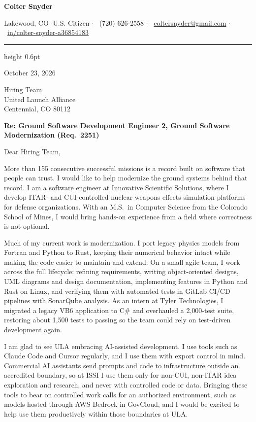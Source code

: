 \documentclass[letterpaper,11pt]{article}
\begin{document}
\begin{center}
  {\Huge\bfseries Colter Snyder}\par\vspace{4pt}
  \footnotesize
  Lakewood, CO \enspace$\cdot$\enspace U.S. Citizen \enspace$\cdot$\enspace
  \faPhone*\ (720) 626-2558 \enspace$\cdot$\enspace
  \faEnvelope\ \href{mailto:coltersnyder@gmail.com}{coltersnyder@gmail.com} \enspace$\cdot$\enspace
  \mbox{\faLinkedin\ \href{https://www.linkedin.com/in/colter-snyder-a36854183/}{in/colter-snyder-a36854183}}
\end{center}
{\color{accent}\hrule height 0.6pt}
\vspace{6pt}

October 23, 2026

Hiring Team\\
United Launch Alliance\\
Centennial, CO 80112

\textbf{Re: Ground Software Development Engineer 2, Ground Software Modernization (Req.\ 2251)}

Dear Hiring Team,

More than 155 consecutive successful missions is a record built on software that people can trust. I
would like to help modernize the ground systems behind that record. I am a software engineer at
Innovative Scientific Solutions, where I develop ITAR- and CUI-controlled nuclear weapons effects
simulation platforms for defense organizations. With an M.S.\ in Computer Science from the Colorado School of
Mines, I would bring hands-on experience from a field where correctness is not optional.

Much of my current work is modernization. I port legacy physics models from Fortran and Python to
Rust, keeping their numerical behavior intact while making the code easier to maintain and extend.
On a small agile team, I work across the full lifecycle: refining requirements, writing
object-oriented designs, UML diagrams and design documentation, implementing features in Python and Rust on Linux,
and verifying them with automated tests in GitLab CI/CD pipelines with SonarQube analysis. As an
intern at Tyler Technologies, I migrated a legacy VB6 application to C\# and overhauled a
2,000-test suite, restoring about 1,500 tests to passing so the team could rely on test-driven
development again.

I am glad to see ULA embracing AI-assisted development. I use tools such as Claude Code and Cursor
regularly, and I use them with export control in mind. Commercial AI assistants send prompts and code
to infrastructure outside an accredited boundary, so at ISSI I use them only for non-CUI, non-ITAR idea
exploration and research, and never with controlled code or data. Bringing these tools to bear on
controlled work calls for an authorized environment, such as models hosted through AWS Bedrock in
GovCloud, and I would be excited to help use them productively within those boundaries at ULA.
\end{document}
